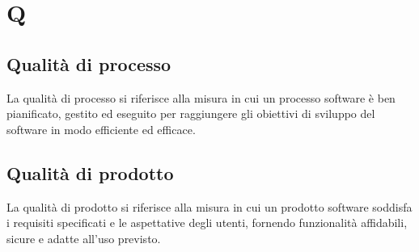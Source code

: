 \section{Q} 
\subsection{Qualità di processo} 
La qualità di processo si riferisce alla misura in cui un processo software è ben pianificato, gestito ed eseguito per raggiungere gli obiettivi di sviluppo del software in modo efficiente ed efficace.
\subsection{Qualità di prodotto} 
La qualità di prodotto si riferisce alla misura in cui un prodotto software soddisfa i requisiti specificati e le aspettative degli utenti, fornendo funzionalità affidabili, sicure e adatte all'uso previsto.
